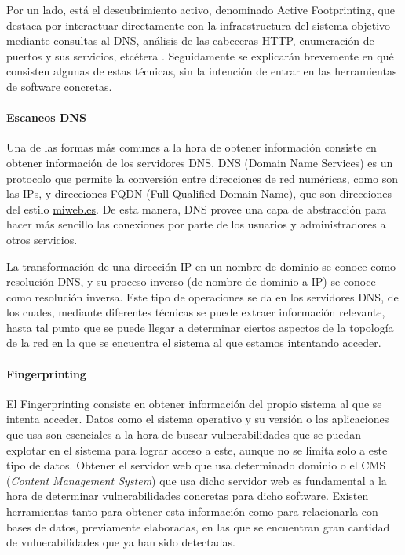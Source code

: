 Por un lado, está el descubrimiento activo, denominado Active Footprinting, que destaca por interactuar directamente con la infraestructura del sistema objetivo mediante consultas al DNS, análisis de las cabeceras HTTP, enumeración de puertos y sus servicios, etcétera \cite{pentesting-kali}. Seguidamente se explicarán brevemente en qué consisten algunas de estas técnicas, sin la intención de entrar en las herramientas de software concretas.

\paragraph{Escaneos DNS}

Una de las formas más comunes a la hora de obtener información consiste en obtener información de los servidores DNS. DNS (Domain Name Services) es un protocolo que permite la conversión entre direcciones de red numéricas, como son las IPs, y direcciones FQDN (Full Qualified Domain Name), que son direcciones del estilo \url{miweb.es}. De esta manera, DNS provee una capa de abstracción para hacer más sencillo las conexiones por parte de los usuarios y administradores a otros servicios.

La transformación de una dirección IP en un nombre de dominio se conoce como resolución DNS, y su proceso inverso (de nombre de dominio a IP) se conoce como resolución inversa. Este tipo de operaciones se da en los servidores DNS, de los cuales, mediante diferentes técnicas se puede extraer información relevante, hasta tal punto que se puede llegar a determinar ciertos aspectos de la topología de la red en la que se encuentra el sistema al que estamos intentando acceder.

\paragraph{Fingerprinting}

El Fingerprinting consiste en obtener información del propio sistema al que se intenta acceder. Datos como el sistema operativo y su versión o las aplicaciones que usa son esenciales a la hora de buscar vulnerabilidades que se puedan explotar en el sistema para lograr acceso a este, aunque no se limita solo a este tipo de datos. Obtener el servidor web que usa determinado dominio o el CMS (\textit{Content Management System}) que usa dicho servidor web es fundamental a la hora de determinar vulnerabilidades concretas para dicho software. Existen herramientas tanto para obtener esta información como para relacionarla con bases de datos, previamente elaboradas, en las que se encuentran gran cantidad de vulnerabilidades que ya han sido detectadas.

